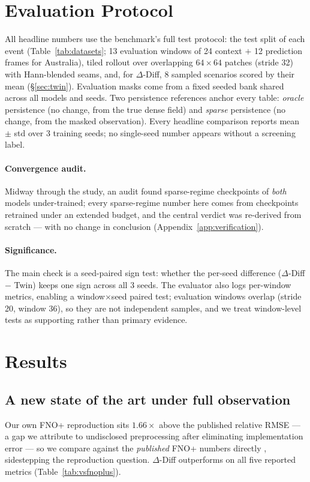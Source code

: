 \documentclass[11pt]{article}
\newcommand{\ours}{\mbox{$\Delta$-Diff}}
\newcommand{\twin}{\mbox{Twin}}
\begin{document}
\section{Evaluation Protocol}
\label{sec:protocol}

All headline numbers use the benchmark's full test protocol: the test
split of each event (Table~\ref{tab:datasets}; 13 evaluation windows of
24 context $+$ 12 prediction frames for Australia), tiled rollout over
overlapping $64\times64$ patches (stride 32) with Hann-blended seams,
and, for \ours{}, 8 sampled scenarios scored by their mean
(\S\ref{sec:twin}). Evaluation masks come from a fixed seeded bank shared
across all models and seeds. Two persistence references anchor every
table: \emph{oracle} persistence (no change, from the true dense field)
and \emph{sparse} persistence (no change, from the masked observation).
Every headline comparison reports mean $\pm$ std over 3 training seeds;
no single-seed number appears without a screening label.

\paragraph{Convergence audit.} Midway through the study, an audit found
sparse-regime checkpoints of \emph{both} models under-trained; every
sparse-regime number here comes from checkpoints retrained under an
extended budget, and the central verdict was re-derived from scratch ---
with no change in conclusion (Appendix~\ref{app:verification}).

\paragraph{Significance.} The main check is a seed-paired sign test:
whether the per-seed difference (\ours{} $-$ \twin{}) keeps one sign
across all 3 seeds. The evaluator also logs per-window metrics, enabling
a window$\times$seed paired test; evaluation windows overlap (stride 20,
window 36), so they are not independent samples, and we treat
window-level tests as supporting rather than primary evidence.

\section{Results}
\label{sec:results}

\subsection{A new state of the art under full observation}
\label{sec:vsfnoplus}
Our own FNO+ reproduction sits $1.66\times$ above the published relative
RMSE --- a gap we attribute to undisclosed preprocessing after
eliminating implementation error --- so we compare against the
\emph{published} FNO+ numbers directly \citep{floodcastbench2025},
sidestepping the reproduction question. \ours{} outperforms on all five
reported metrics (Table~\ref{tab:vsfnoplus}).
\end{document}
